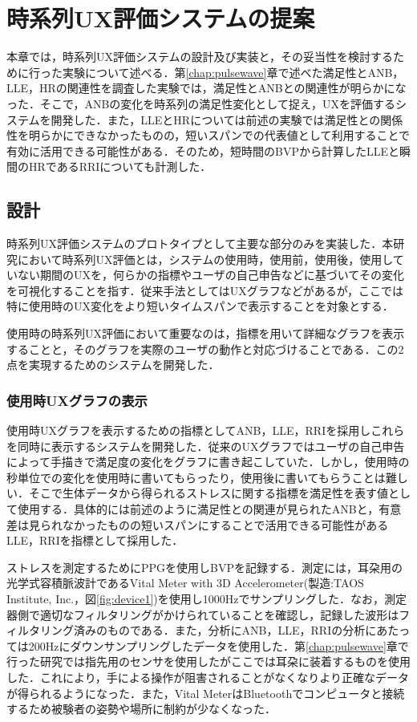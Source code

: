 \chapter{時系列UX評価システムの提案}
\label{chap:sequential}

本章では，時系列UX評価システムの設計及び実装と，その妥当性を検討するために行った実験について述べる．第\ref{chap:pulsewave}章で述べた満足性とANB，LLE，HRの関連性を調査した実験では，満足性とANBとの関連性が明らかになった．そこで，ANBの変化を時系列の満足性変化として捉え，UXを評価するシステムを開発した．また，LLEとHRについては前述の実験では満足性との関係性を明らかにできなかったものの，短いスパンでの代表値として利用することで有効に活用できる可能性がある．そのため，短時間のBVPから計算したLLEと瞬間のHRであるRRIについても計測した．

\section{設計}

時系列UX評価システムのプロトタイプとして主要な部分のみを実装した．本研究において時系列UX評価とは，システムの使用時，使用前，使用後，使用していない期間のUXを，何らかの指標やユーザの自己申告などに基づいてその変化を可視化することを指す．従来手法としてはUXグラフなどがあるが，ここでは特に使用時のUX変化をより短いタイムスパンで表示することを対象とする．

使用時の時系列UX評価において重要なのは，指標を用いて詳細なグラフを表示することと，そのグラフを実際のユーザの動作と対応づけることである．この2点を実現するためのシステムを開発した．

\subsection{使用時UXグラフの表示}

使用時UXグラフを表示するための指標としてANB，LLE，RRIを採用しこれらを同時に表示するシステムを開発した．従来のUXグラフではユーザの自己申告によって手描きで満足度の変化をグラフに書き起こしていた．しかし，使用時の秒単位での変化を使用時に書いてもらったり，使用後に書いてもらうことは難しい．そこで生体データから得られるストレスに関する指標を満足性を表す値として使用する．具体的には前述のように満足性との関連が見られたANBと，有意差は見られなかったものの短いスパンにすることで活用できる可能性があるLLE，RRIを指標として採用した．

ストレスを測定するためにPPGを使用しBVPを記録する．測定には，耳朶用の光学式容積脈波計であるVital Meter with 3D Accelerometer(製造:TAOS Institute, Inc.，図\ref{fig:device1})を使用し1000Hzでサンプリングした．なお，測定器側で適切なフィルタリングがかけられていることを確認し，記録した波形はフィルタリング済みのものである．また，分析にANB，LLE，RRIの分析にあたっては200Hzにダウンサンプリングしたデータを使用した．第\ref{chap:pulsewave}章で行った研究では指先用のセンサを使用したがここでは耳朶に装着するものを使用した．これにより，手による操作が阻害されることがなくなりより正確なデータが得られるようになった．また，Vital MeterはBluetoothでコンピュータと接続するため被験者の姿勢や場所に制約が少なくなった．

